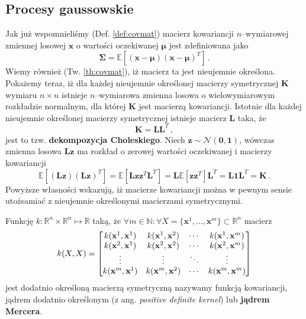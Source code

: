 \documentclass{myclass}
\numberwithin{equation}{section}
\begin{document}
\subsection{Procesy gaussowskie}

Jak już wspomnieliśmy (Def. \ref{def:covmat}) macierz kowariancji \(n\)--wymiarowej zmiennej losowej
\(\mathbf{x}\) o wartości oczekiwanej \(\boldsymbol{\mu}\) jest zdefiniowana jako
\begin{equation}
    \mathbf{\Sigma} = \mathbb{E}\left[(\mathbf{x} - \boldsymbol{\mu})(\mathbf{x} - \boldsymbol{\mu})^T\right]\,.
\end{equation}
Wiemy również (Tw. \ref{th:covmat}), iż macierz ta jest nieujemnie określona. Pokażemy teraz, iż dla
każdej nieujemnie określonej macierzy symetrycznej \(\mathbf{K}\) wymiaru \(n\times n\) istnieje
\(n\)--wymiarowa zmienna losowa o wielowymiarowym rozkładzie normalnym, dla której \(\mathbf{K}\)
jest macierzą kowariancji. Istotnie dla każdej nieujemnie określonej macierzy symetrycznej istnieje
macierz \(\mathbf{L}\) taka, że
\begin{equation}
    \mathbf{K} = \mathbf{L}\mathbf{L}^T\,,
\end{equation}
jest to tzw. \textbf{dekompozycja Choleskiego}. Niech \(\mathbf{z} \sim \mathcal{N}(\mathbf{0},
\mathbf{1})\), wówczas zmienna losowa \(\mathbf{L}\mathbf{z}\) ma rozkład o zerowej wartości
oczekiwanej i macierzy kowariancji
\begin{equation}
    \mathbb{E}\left[(\mathbf{L}\mathbf{z})(\mathbf{L}\mathbf{z})^T\right] = \mathbb{E}\left[\mathbf{L}\mathbf{z}\mathbf{z}^T\mathbf{L}^T\right] = \mathbf{L}\mathbb{E}[\mathbf{z}\mathbf{z}^T]\mathbf{L}^T = \mathbf{L}\mathbf{1}\mathbf{L}^T = \mathbf{K}\,.
\end{equation}
Powyższe własności wskazują, iż macierze kowariancji można w pewnym sensie utożsamiać z nieujemnie
określonymi macierzami symetrycznymi.

\begin{definition}
Funkcję \(k: \mathbb{R}^n\times\mathbb{R}^n\mapsto\mathbb{R}\) taką, że \(\forall m\in\mathbb{N} :
\forall X = \{\mathbf{x}^1,\ldots,\mathbf{x}^m\} \subset \mathbb{R}^n\) macierz
\begin{equation*}
    k(X,X) = \mqty[k(\mathbf{x}^1, \mathbf{x}^1) & k(\mathbf{x}^1, \mathbf{x}^2) & \cdots & k(\mathbf{x}^1, \mathbf{x}^m)\\
    k(\mathbf{x}^2, \mathbf{x}^1) & k(\mathbf{x}^2, \mathbf{x}^2) & \cdots & k(\mathbf{x}^2, \mathbf{x}^m)\\
    \vdots & \vdots & \ddots & \vdots\\
    k(\mathbf{x}^m, \mathbf{x}^1) & k(\mathbf{x}^m, \mathbf{x}^2) & \cdots & k(\mathbf{x}^m, \mathbf{x}^m)\\]
\end{equation*}
jest dodatnio określoną macierzą symetryczną nazywamy funkcją kowariancji, jądrem dodatnio
określonym (z ang. \textit{positive definite kernel}) lub \textbf{jądrem Mercera}.
\end{definition}
\end{document}
